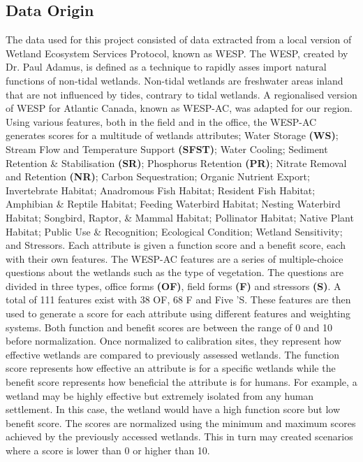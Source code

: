 \documentclass[12pt,letterpaper]{article}
\begin{document}
\subsection{Data Origin}
The data used for this project consisted of data extracted from a local version of Wetland Ecosystem Services Protocol, known as WESP.
The WESP, created by Dr. Paul Adamus, is defined as a technique to rapidly asses import natural functions of non-tidal wetlands.
Non-tidal wetlands are freshwater areas inland that are not influenced by tides, contrary to tidal wetlands.
A regionalised version of WESP for Atlantic Canada, known as \ac{WESP-AC}, was adapted for our region.
Using various features, both in the field and in the office, the \acs{WESP-AC} generates scores for a multitude of wetlands attributes; Water Storage \textbf{(WS)}; Stream Flow and Temperature Support \textbf{(SFST)}; Water Cooling; Sediment Retention \& Stabilisation \textbf{(SR)}; Phosphorus Retention \textbf{\textbf{(PR)}}; Nitrate Removal and Retention \textbf{\textbf{(NR)}}; Carbon Sequestration; Organic Nutrient Export; Invertebrate Habitat; Anadromous Fish Habitat; Resident Fish Habitat; Amphibian \& Reptile Habitat; Feeding Waterbird Habitat; Nesting Waterbird Habitat; Songbird, Raptor, \& Mammal Habitat; Pollinator Habitat; Native Plant Habitat; Public Use \& Recognition; Ecological Condition; Wetland Sensitivity; and Stressors.
Each attribute is given a function score and a benefit score, each with their own features.
The WESP-AC features are a series of multiple-choice questions about the wetlands such as the type of vegetation.
The questions are divided in three types, office forms \textbf{(OF)}, field forms \textbf{(F)} and stressors \textbf{(S)}.
A total of 111 features exist with 38 OF, 68 F and Five 'S.
These features are then used to generate a score for each attribute using different features and weighting systems.
Both function and benefit scores are between the range of 0 and 10 before normalization.
Once normalized to calibration sites, they represent how effective wetlands are compared to previously assessed wetlands.
The function score represents how effective an attribute is for a specific wetlands while the benefit score represents how beneficial the attribute is for humans.
For example, a wetland may be highly effective but extremely isolated from any human settlement.
In this case, the wetland would have a high function score but low benefit score.
The scores are normalized using the minimum and maximum scores achieved by the previously accessed wetlands.
This in turn may created scenarios where a score is lower than 0 or higher than 10.
\end{document}
